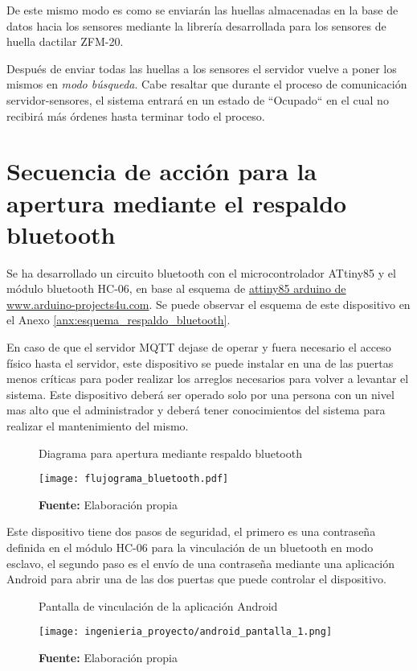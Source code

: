 \documentclass[../principal]{subfiles}
\begin{document}
  De este mismo modo es como se enviarán las huellas almacenadas en la base de datos hacia los sensores mediante la librería desarrollada para los sensores de huella dactilar ZFM-20.

  Después de enviar todas las huellas a los sensores el servidor vuelve a poner los mismos en \textit{modo búsqueda}. Cabe resaltar que durante el proceso de comunicación servidor-sensores, el sistema entrará en un estado de ``Ocupado`` en el cual no recibirá más órdenes hasta terminar todo el proceso.

  \section{Secuencia de acción para la apertura mediante el respaldo bluetooth}

  Se ha desarrollado un circuito bluetooth con el microcontrolador ATtiny85 y el módulo bluetooth HC-06, en base al esquema de \href{http://arduino-projects4u.com/attiny85-arduino/}{attiny85 arduino de www.arduino-projects4u.com}. Se puede observar el esquema de este dispositivo en el Anexo \ref{anx:esquema_respaldo_bluetooth}.

  En caso de que el servidor MQTT dejase de operar y fuera necesario el acceso físico hasta el servidor, este dispositivo se puede instalar en una de las puertas menos críticas para poder realizar los arreglos necesarios para volver a levantar el sistema. Este dispositivo deberá ser operado solo por una persona con un nivel mas alto que el administrador y deberá tener conocimientos del sistema para realizar el mantenimiento del mismo.

  \begin{figure}[h]
    \centering
    \caption{Diagrama para apertura mediante respaldo bluetooth}
    \texttt{[image: flujograma\_bluetooth.pdf]}
    \caption*{\textbf{Fuente:} Elaboración propia}
    \label{fig:flujo_respaldo_bluetooth}
  \end{figure}

  Este dispositivo tiene dos pasos de seguridad, el primero es una contraseña definida en el módulo HC-06 para la vinculación de un bluetooth en modo esclavo, el segundo paso es el envío de una contraseña mediante una aplicación Android para abrir una de las dos puertas que puede controlar el dispositivo.

  \begin{figure}[H]
    \centering
    \caption{Pantalla de vinculación de la aplicación Android}
    \texttt{[image: ingenieria\_proyecto/android\_pantalla\_1.png]}
    \caption*{\textbf{Fuente:} Elaboración propia}
    \label{fig:android_pantalla_1}
  \end{figure}
\end{document}
